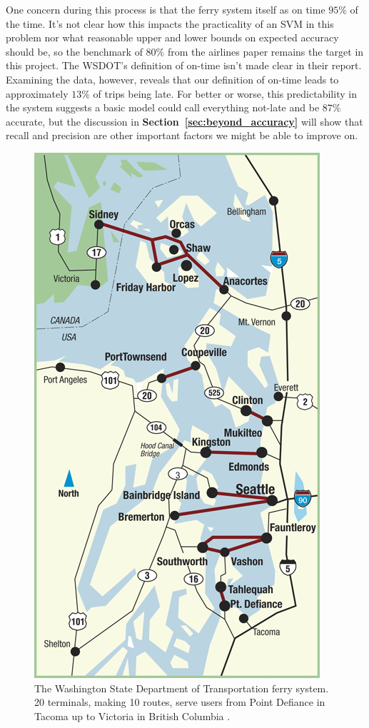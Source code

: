 \documentclass[11pt]{article} %
\begin{document}
One concern during this process is that the ferry system itself as on 
time $95\%$ of the time. It's not clear how this impacts the
practicality of an SVM in this problem nor what reasonable upper and lower bounds
on expected accuracy should be, so the benchmark of $80\%$ from the
airlines paper \cite{smith2008decision} remains the target in this project. The
WSDOT's definition of on-time isn't made clear in their report. Examining the 
data, however, reveals that our definition of on-time leads to approximately
$13\%$ of trips being late. For better or worse, this predictability in the 
system suggests a basic model could call everything not-late and be $87\%$ 
accurate, but the discussion in \textbf{Section~\ref{sec:beyond_accuracy}} will 
show that recall and precision are other important factors we might be able to 
improve on.

\begin{figure}
  \centering
  \includegraphics[scale=.4]{images/route-map-overview.png}
  \caption{The Washington State Department of Transportation ferry system. 20
  terminals, making 10 routes, serve users from Point Defiance in Tacoma up to
  Victoria in British Columbia \cite{wsdotVesselWatch}.}
  \label{fig:ferry_system}
\end{figure}
\end{document}
